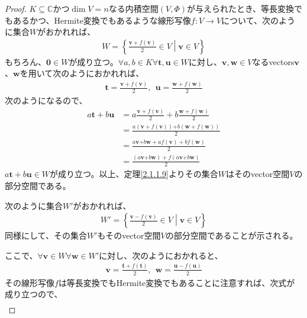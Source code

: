 \documentclass[dvipdfmx]{jsarticle}
\begin{document}
\begin{proof}
$K \subseteq \mathbb{C}$かつ$\dim V = n$なる内積空間$(V,\varPhi)$が与えられたとき、等長変換でもあるかつ、Hermite変換でもあるような線形写像$f:V \rightarrow V$について、次のように集合$W$がおかれれば、
\begin{align*}
W = \left\{ \frac{\mathbf{v} + f\left( \mathbf{v} \right)}{2} \in V \middle| \mathbf{v} \in V \right\}
\end{align*}
もちろん、$\mathbf{0} \in W$が成り立つ。$\forall a,b \in K\forall\mathbf{t},\mathbf{u} \in W$に対し、$\mathbf{v},\mathbf{w} \in V$なるvectors$\mathbf{v}$、$\mathbf{w}$を用いて次のようにおかれれば、
\begin{align*}
\mathbf{t} = \frac{\mathbf{v} + f\left( \mathbf{v} \right)}{2},\ \ \mathbf{u} = \frac{\mathbf{w} + f\left( \mathbf{w} \right)}{2}
\end{align*}
次のようになるので、
\begin{align*}
a\mathbf{t} + b\mathbf{u} &= a\frac{\mathbf{v} + f\left( \mathbf{v} \right)}{2} + b\frac{\mathbf{w} + f\left( \mathbf{w} \right)}{2}\\
&= \frac{a\left( \mathbf{v} + f\left( \mathbf{v} \right) \right)\mathbf{+}b\left( \mathbf{w} + f\left( \mathbf{w} \right) \right)}{2}\\
&= \frac{a\mathbf{v}\mathbf{+}b\mathbf{w} + af\left( \mathbf{v} \right) + bf\left( \mathbf{w} \right)}{2}\\
&= \frac{\left( a\mathbf{v}\mathbf{+}b\mathbf{w} \right) + f\left( a\mathbf{v}\mathbf{+}b\mathbf{w} \right)}{2}
\end{align*}
$a\mathbf{t} + b\mathbf{u} \in W$が成り立つ。以上、定理\ref{2.1.1.9}よりその集合$W$はそのvector空間$V$の部分空間である。\par
次のように集合$W'$がおかれれば、
\begin{align*}
W' = \left\{ \frac{\mathbf{v} - f\left( \mathbf{v} \right)}{2} \in V \middle| \mathbf{v} \in V \right\}
\end{align*}
同様にして、その集合$W'$もそのvector空間$V$の部分空間であることが示される。\par
ここで、$\forall\mathbf{v} \in W\forall\mathbf{w} \in W'$に対し、次のようにおかれると、
\begin{align*}
\mathbf{v} = \frac{\mathbf{t} + f\left( \mathbf{t} \right)}{2},\ \ \mathbf{w} = \frac{\mathbf{u} - f\left( \mathbf{u} \right)}{2}
\end{align*}
その線形写像$f$は等長変換でもHermite変換でもあることに注意すれば、次式が成り立つので、
\begin{align*}

\end{align*}
\end{proof}
\end{document}
